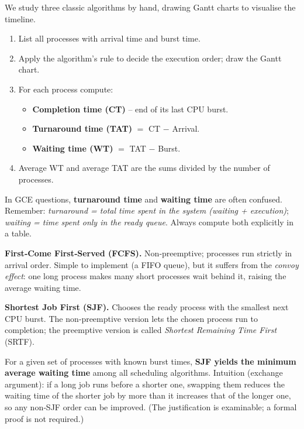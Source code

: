 \documentclass[11pt]{article}
\newcommand{\cle}[1]{{\popxbold\color{popdark}#1}}
\begin{document}
We study three classic algorithms by hand, drawing \cle{Gantt charts} to visualise the timeline.

\begin{methode}
\begin{enumerate}
  \item List all processes with arrival time and burst time.
  \item Apply the algorithm's rule to decide the execution order; draw the Gantt chart.
  \item For each process compute:
        \begin{itemize}
          \item \textbf{Completion time (CT)} – end of its last CPU burst.
          \item \textbf{Turnaround time (TAT)} $=$ CT $-$ Arrival.
          \item \textbf{Waiting time (WT)} $=$ TAT $-$ Burst.
        \end{itemize}
  \item Average WT and average TAT are the sums divided by the number of processes.
\end{enumerate}
\end{methode}

\begin{attention}
In GCE questions, \textbf{turnaround time} and \textbf{waiting time} are often confused.  Remember: \emph{turnaround = total time spent in the system (waiting + execution)}; \emph{waiting = time spent only in the ready queue}.  Always compute both explicitly in a table.
\end{attention}

\textbf{First‑Come First‑Served (FCFS).}  Non‑preemptive; processes run strictly in arrival order.  Simple to implement (a FIFO queue), but it suffers from the \emph{convoy effect}: one long process makes many short processes wait behind it, raising the average waiting time.

\textbf{Shortest Job First (SJF).}  Chooses the ready process with the smallest next CPU burst.  The non‑preemptive version lets the chosen process run to completion; the preemptive version is called \emph{Shortest Remaining Time First} (SRTF).

\begin{propriete}
For a given set of processes with known burst times, \textbf{SJF yields the minimum average waiting time} among all scheduling algorithms.  Intuition (exchange argument): if a long job runs before a shorter one, swapping them reduces the waiting time of the shorter job by more than it increases that of the longer one, so any non‑SJF order can be improved.  (The justification is examinable; a formal proof is not required.)
\end{propriete}
\end{document}
